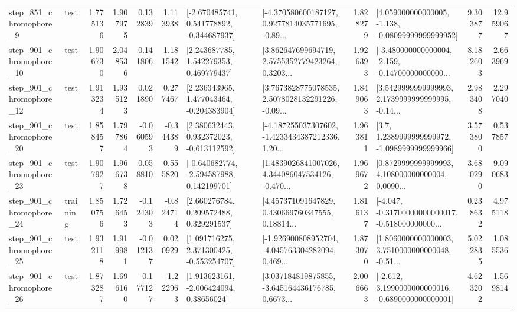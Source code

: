 \begin{tabular}{llrrrrllrlrr}
   step\_851\_chromophore\_9 &      test &      1.775136 &    1.907975 &      0.132839 &  1.113938 &   [-2.670485741, 0.541778892, -0.344687937] &  [-4.370580600187127, 0.9277814035771695, -0.89... &       1.828279 &  [4.059000000000005, -1.138, -0.08099999999999952] &            9.303877 &         12.959067 \\
  step\_901\_chromophore\_10 &      test &      1.906730 &    2.048536 &      0.141806 &  1.181542 &     [2.243687785, 1.542279353, 0.469779437] &  [3.862647699694719, 2.5755352779423264, 0.3203... &       1.926393 &  [-3.480000000000004, -2.159, -0.14700000000000... &            8.182603 &          2.663969 \\
  step\_901\_chromophore\_12 &      test &      1.913234 &    1.935123 &      0.021890 &  0.277467 &    [2.236343965, 1.477043464, -0.204383904] &  [3.7673828775078535, 2.5078028132291226, -0.09... &       1.849063 &  [3.5429999999999993, 2.1739999999999995, -0.14... &            2.983408 &          2.297040 \\
  step\_901\_chromophore\_20 &      test &      1.858457 &    1.797864 &     -0.060593 & -0.344389 &    [2.380632443, 0.932372023, -0.613112592] &  [-4.187255037307602, -1.4233434387212336, 1.20... &       1.963811 &     [3.7, 1.2389999999999972, -1.0989999999999966] &            3.573800 &          0.537857 \\
  step\_901\_chromophore\_23 &      test &      1.907927 &    1.966738 &      0.058810 &  0.555820 &   [-0.640682774, -2.594587988, 0.142199701] &  [1.4839026841007026, 4.344086047534126, -0.470... &       1.969672 &  [0.8729999999999993, 4.108000000000004, 0.0090... &            3.680290 &          9.090683 \\
  step\_901\_chromophore\_24 &  training &      1.850756 &    1.726453 &     -0.124303 & -0.824714 &     [2.660276784, 0.209572488, 0.329291537] &  [4.457371091647829, 0.430669760347555, 0.18814... &       1.816137 &  [-4.047, -0.31700000000000017, -0.518000000000... &            0.238632 &          4.975118 \\
  step\_901\_chromophore\_25 &      test &      1.932118 &    1.919981 &     -0.012137 &  0.020929 &    [1.091716275, 2.371300425, -0.553254707] &  [-1.926900808952704, -4.045763304282094, 0.469... &       1.873070 &  [1.8060000000000003, 3.7510000000000048, -0.51... &            5.022835 &          1.085536 \\
  step\_901\_chromophore\_26 &      test &      1.873287 &    1.696160 &     -0.177127 & -1.222963 &     [1.913623161, -2.006424094, 0.38656024] &  [3.037184819875855, -3.645164436176785, 0.6673... &       2.006663 &  [-2.612, 3.1990000000000016, -0.6890000000000001] &            4.623202 &          1.569814 \\

\end{tabular}

